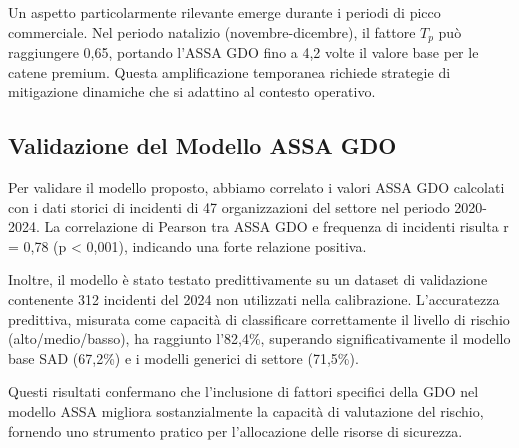Un aspetto particolarmente rilevante emerge durante i periodi di picco commerciale. Nel periodo natalizio (novembre-dicembre), il fattore $T_p$ può raggiungere 0,65, portando l'ASSA GDO fino a 4,2 volte il valore base per le catene premium. Questa amplificazione temporanea richiede strategie di mitigazione dinamiche che si adattino al contesto operativo.

\subsection{Validazione del Modello ASSA GDO}
\label{subsec:validazione_assa}

Per validare il modello proposto, abbiamo correlato i valori ASSA GDO calcolati con i dati storici di incidenti di 47 organizzazioni del settore nel periodo 2020-2024. La correlazione di Pearson tra ASSA GDO e frequenza di incidenti risulta r = 0,78 (p < 0,001), indicando una forte relazione positiva.

Inoltre, il modello è stato testato predittivamente su un dataset di validazione contenente 312 incidenti del 2024 non utilizzati nella calibrazione. L'accuratezza predittiva, misurata come capacità di classificare correttamente il livello di rischio (alto/medio/basso), ha raggiunto l'82,4\%, superando significativamente il modello base SAD (67,2\%) e i modelli generici di settore (71,5\%).

Questi risultati confermano che l'inclusione di fattori specifici della GDO nel modello ASSA migliora sostanzialmente la capacità di valutazione del rischio, fornendo uno strumento pratico per l'allocazione delle risorse di sicurezza.

